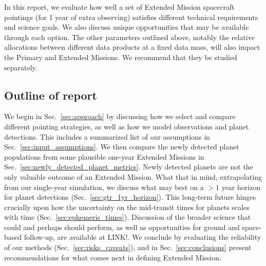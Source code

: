 In this report, we evaluate how well a set of Extended Mission spacecraft pointings (for 1 year of extra observing) satisfies different technical requirements and science goals. 
We also discuss unique opportunities that may be available through each option.
The other parameters outlined above, notably the relative allocations between different data products at a fixed data mass, will also impact the Primary and Extended Missions. We recommend that they be studied separately.


\subsection{Outline of report}
We begin in Sec.~\ref{sec:approach} by discussing how we select and compare different pointing strategies, as well as how we model \tesss observations and planet detections.
This includes a summarized list of our assumptions in Sec.~\ref{sec:input_assumptions}.
We then compare the newly detected planet populations from some plausible one-year Extended Missions in Sec.~\ref{sec:newly_detected_planet_metrics}. 
Newly detected planets are not the only valuable outcome of an Extended Mission.
What that in mind, extrapolating from our single-year simulation, we discuss what may best on a $>1$ year horizon for planet detections (Sec.~\ref{sec:gtr_1yr_horizon}).
This long-term future hinges crucially upon how the uncertainty on the mid-transit times for \tess planets scales with time (Sec.~\ref{sec:ephemeris_times}).
Discussion of the broader science that \tess could and perhaps should perform, as well as opportunities for ground and space-based follow-up, are available at LINK!.
We conclude by evaluating the reliability of our methods (Sec.~\ref{sec:risks_caveats}), and in Sec.~\ref{sec:conclusions} present recommendations for what comes next in defining \tesss Extended Mission.
